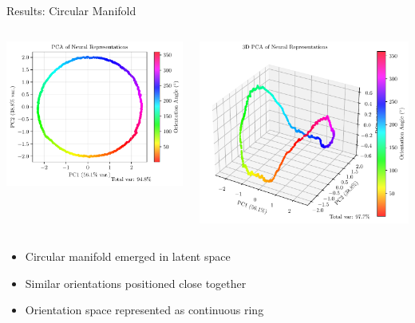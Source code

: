 \documentclass[aspectratio=169]{beamer}
\begin{document}
\begin{frame}{Results: Circular Manifold}
    \begin{columns}
        \includegraphics[width=\textwidth]{results/pca_latent_space.pdf}
        
        \includegraphics[width=\textwidth]{results/3d_manifold.pdf}
    \end{columns}
    \vspace{0.5cm}
    \begin{itemize}
        \item Circular manifold emerged in latent space
        \item Similar orientations positioned close together
        \item Orientation space represented as continuous ring
    \end{itemize}
\end{frame}
\end{document}
